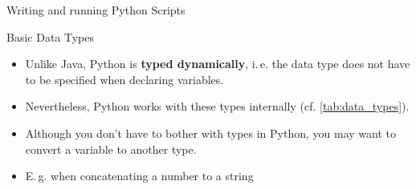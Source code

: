\begin{dwHeaderFrame}{Writing and running Python Scripts}

\end{dwHeaderFrame}


\begin{frame}
	
\end{frame}



\begin{dwHeaderFrame}{Basic Data Types}
	\begin{itemize}
		\item Unlike Java, Python is \textbf{typed dynamically}, i.\,e. the data type does not have to be specified when declaring variables.
		\item Nevertheless, Python works with these types internally (cf. \cref{tab:data_types}).
	\end{itemize}
	
	
\end{dwHeaderFrame}


\begin{frame}
	
\end{frame}


\begin{frame}{}
	\begin{itemize}
		\item Although you don't have to bother with types in Python, you may want to convert a variable to another type.
		\item E.\,g. when concatenating a number to a string
	\end{itemize}
	
	
\end{frame}


\begin{frame}
	
\end{frame}


